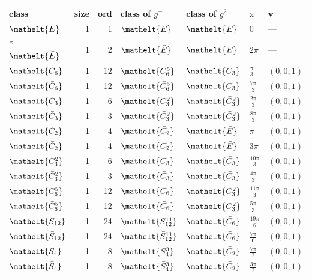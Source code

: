 \documentclass[10pt,a4paper]{article}
\numberwithin{equation}{section}
\newcommand{\eltfont}[1]{{\let\sigma\eltsigma\mathelt{#1}}}
\newcommand{\cls}[1]{\eltfont{#1}}
\newcommand{\dirvec}[3]{(#1, #2, #3)}
\newcommand{\vv}{\mathbf{v}}
\newcommand{\barred}[1]{\bar{#1}}
\begin{document}
{\renewcommand{\arraystretch}{1.3}\begin{longtable}{@{}lrrllll@{}}\toprule
class & size & ord & class of $g^{-1}$ & class of $g^{2}$ & $\omega$ & $\vv$\\\midrule\endhead
\bottomrule\endfoot\endlastfoot
$\cls{E}$ & 1 & 1 & $\cls{E}$ & $\cls{E}$ & $0$ & ---\\*
$\cls{\barred{E}}$ & 1 & 2 & $\cls{\barred{E}}$ & $\cls{E}$ & $2\pi$ & ---\\
$\cls{C_{6}}$ & 1 & 12 & $\cls{C_{6}^{5}}$ & $\cls{C_{3}}$ & $\tfrac{\pi}{3}$ & $\dirvec{0}{0}{1}$\\
$\cls{\barred{C}_{6}}$ & 1 & 12 & $\cls{\barred{C}_{6}^{5}}$ & $\cls{C_{3}}$ & $\tfrac{7\pi}{3}$ & $\dirvec{0}{0}{1}$\\
$\cls{C_{3}}$ & 1 & 6 & $\cls{C_{3}^{2}}$ & $\cls{\barred{C}_{3}^{2}}$ & $\tfrac{2\pi}{3}$ & $\dirvec{0}{0}{1}$\\
$\cls{\barred{C}_{3}}$ & 1 & 3 & $\cls{\barred{C}_{3}^{2}}$ & $\cls{\barred{C}_{3}^{2}}$ & $\tfrac{8\pi}{3}$ & $\dirvec{0}{0}{1}$\\
$\cls{C_{2}}$ & 1 & 4 & $\cls{\barred{C}_{2}}$ & $\cls{\barred{E}}$ & $\pi$ & $\dirvec{0}{0}{1}$\\
$\cls{\barred{C}_{2}}$ & 1 & 4 & $\cls{C_{2}}$ & $\cls{\barred{E}}$ & $3\pi$ & $\dirvec{0}{0}{1}$\\
$\cls{C_{3}^{2}}$ & 1 & 6 & $\cls{C_{3}}$ & $\cls{\barred{C}_{3}}$ & $\tfrac{10\pi}{3}$ & $\dirvec{0}{0}{1}$\\
$\cls{\barred{C}_{3}^{2}}$ & 1 & 3 & $\cls{\barred{C}_{3}}$ & $\cls{\barred{C}_{3}}$ & $\tfrac{4\pi}{3}$ & $\dirvec{0}{0}{1}$\\
$\cls{C_{6}^{5}}$ & 1 & 12 & $\cls{C_{6}}$ & $\cls{C_{3}^{2}}$ & $\tfrac{11\pi}{3}$ & $\dirvec{0}{0}{1}$\\
$\cls{\barred{C}_{6}^{5}}$ & 1 & 12 & $\cls{\barred{C}_{6}}$ & $\cls{C_{3}^{2}}$ & $\tfrac{5\pi}{3}$ & $\dirvec{0}{0}{1}$\\
$\cls{S_{12}}$ & 1 & 24 & $\cls{S_{12}^{11}}$ & $\cls{\barred{C}_{6}}$ & $\tfrac{19\pi}{6}$ & $\dirvec{0}{0}{1}$\\
$\cls{\barred{S}_{12}}$ & 1 & 24 & $\cls{\barred{S}_{12}^{11}}$ & $\cls{\barred{C}_{6}}$ & $\tfrac{7\pi}{6}$ & $\dirvec{0}{0}{1}$\\
$\cls{S_{4}}$ & 1 & 8 & $\cls{S_{4}^{3}}$ & $\cls{\barred{C}_{2}}$ & $\tfrac{7\pi}{2}$ & $\dirvec{0}{0}{1}$\\
$\cls{\barred{S}_{4}}$ & 1 & 8 & $\cls{\barred{S}_{4}^{3}}$ & $\cls{\barred{C}_{2}}$ & $\tfrac{3\pi}{2}$ & $\dirvec{0}{0}{1}$\\

\end{longtable}}
\end{document}
